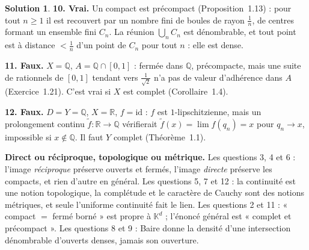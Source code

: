 \documentclass[11pt,a4paper]{article}
\newcommand{\R}{\mathbb{R}}
\newcommand{\Q}{\mathbb{Q}}
\newcommand{\K}{\mathbb{K}}
\theoremstyle{definition}
\newtheorem*{solution}{Solution}
\begin{document}
\begin{solution}
\medskip
\noindent\textbf{10. Vrai.} Un compact est précompact (Proposition~1.13) : pour tout $n\ge1$ il est recouvert par un nombre fini de boules de rayon $\frac1n$, de centres formant un ensemble fini $C_n$. La réunion $\bigcup_nC_n$ est dénombrable, et tout point est à distance $<\frac1n$ d'un point de $C_n$ pour tout $n$ : elle est dense.

\medskip
\noindent\textbf{11. Faux.} $X=\Q$, $A=\Q\cap[0,1]$ : fermée dans $\Q$, précompacte, mais une suite de rationnels de $[0,1]$ tendant vers $\frac1{\sqrt2}$ n'a pas de valeur d'adhérence dans $A$ (Exercice~1.21). C'est vrai si $X$ est complet (Corollaire~1.4).

\medskip
\noindent\textbf{12. Faux.} $D=Y=\Q$, $X=\R$, $f=\mathrm{id}$ : $f$ est $1$-lipschitzienne, mais un prolongement continu $\tilde f:\R\to\Q$ vérifierait $\tilde f(x)=\lim f(q_n)=x$ pour $q_n\to x$, impossible si $x\notin\Q$. Il faut $Y$ complet (Théorème~1.1).
\end{solution}

\begin{piege}
\textbf{Direct ou réciproque, topologique ou métrique.} Les questions 3, 4 et 6 : l'image \emph{réciproque} préserve ouverts et fermés, l'image \emph{directe} préserve les compacts, et rien d'autre en général. Les questions 5, 7 et 12 : la continuité est une notion topologique, la complétude et le caractère de Cauchy sont des notions métriques, et seule l'uniforme continuité fait le lien. Les questions 2 et 11 : « compact $=$ fermé borné » est propre à $\K^d$ ; l'énoncé général est « complet et précompact ». Les questions 8 et 9 : Baire donne la densité d'une intersection dénombrable d'ouverts denses, jamais son ouverture.
\end{piege}
\end{document}
